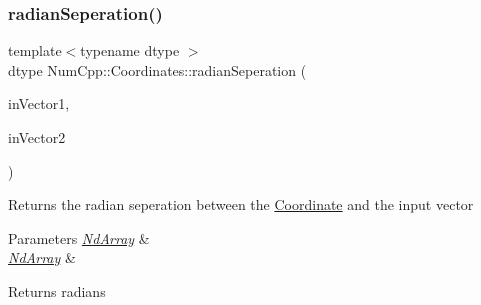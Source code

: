 \subsubsection{\texorpdfstring{radian\+Seperation()}{radianSeperation()}\hspace{0.1cm}{\footnotesize\ttfamily [2/2]}}
{\footnotesize\ttfamily template$<$typename dtype $>$ \\
dtype Num\+Cpp\+::\+Coordinates\+::radian\+Seperation (\begin{DoxyParamCaption}\item[{const \mbox{\hyperlink{class_num_cpp_1_1_nd_array}{Nd\+Array}}$<$ dtype $>$ \&}]{in\+Vector1,  }\item[{const \mbox{\hyperlink{class_num_cpp_1_1_nd_array}{Nd\+Array}}$<$ dtype $>$ \&}]{in\+Vector2 }\end{DoxyParamCaption})}

Returns the radian seperation between the \mbox{\hyperlink{class_num_cpp_1_1_coordinates_1_1_coordinate}{Coordinate}} and the input vector


\begin{DoxyParams}{Parameters}
{\em \mbox{\hyperlink{class_num_cpp_1_1_nd_array}{Nd\+Array}}} & \\
\hline
{\em \mbox{\hyperlink{class_num_cpp_1_1_nd_array}{Nd\+Array}}} & \\
\hline
\end{DoxyParams}
\begin{DoxyReturn}{Returns}
radians 
\end{DoxyReturn}
